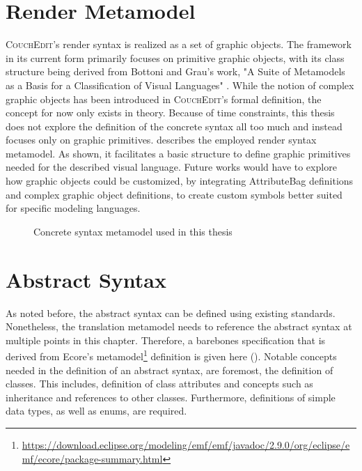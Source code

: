 \section{Render Metamodel}
\textsc{CouchEdit}'s render syntax is realized as a set of graphic objects. The framework in its current form primarily focuses on primitive graphic objects, with its class structure being derived from Bottoni and Grau's work, "A Suite of Metamodels as a Basis for a Classification of Visual Languages" \cite{nachreiner_couchedit_2020, bottoni_suite_2004}. While the notion of complex graphic objects has been introduced in \textsc{CouchEdit}'s formal definition, the concept for now only exists in theory. Because of time constraints, this thesis does not explore the definition of the concrete syntax all too much and instead focuses only on graphic primitives.  describes the employed render syntax metamodel. As shown, it facilitates a basic structure to define graphic primitives needed for the described visual language. Future works would have to explore how graphic objects could be customized, by integrating AttributeBag definitions and complex graphic object definitions, to create custom symbols better suited for specific modeling languages.

\begin{figure}[h]
  \centering
  
  \caption{Concrete syntax metamodel used in this thesis}
  \label{fig:concretesyntax}
\end{figure}


\section{Abstract Syntax}
\label{sec:abstract-syntax}
As noted before, the abstract syntax can be defined using existing standards. Nonetheless, the translation metamodel needs to reference the abstract syntax at multiple points in this chapter. Therefore, a barebones specification that is derived from Ecore's metamodel\footnote{\url{https://download.eclipse.org/modeling/emf/emf/javadoc/2.9.0/org/eclipse/emf/ecore/package-summary.html}} definition is given here (). Notable concepts needed in the definition of an abstract syntax, are foremost, the definition of classes. This includes, definition of class attributes and concepts such as inheritance and references to other classes. Furthermore, definitions of simple data types, as well as enums, are required.


